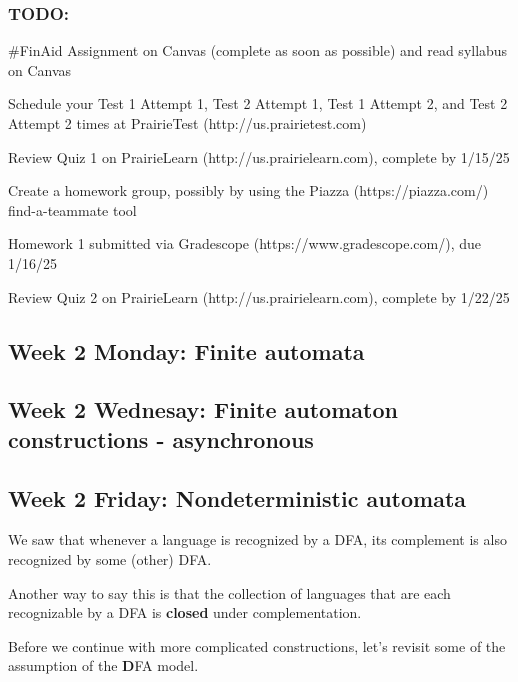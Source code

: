 \subsubsection*{TODO:}
\begin{list}{\itemsep-10pt}
   \item \#FinAid Assignment on Canvas (complete as soon as possible) and read syllabus on Canvas
   \item Schedule your Test 1 Attempt 1, Test 2 Attempt 1, Test 1 Attempt 2, and Test 2 Attempt 2 times 
   at PrairieTest (http://us.prairietest.com)
   \item Review Quiz 1 on PrairieLearn (http://us.prairielearn.com), complete by 1/15/25
   \item Create a homework group, possibly by using the Piazza (https://piazza.com/) find-a-teammate tool
   \item Homework 1 submitted via Gradescope (https://www.gradescope.com/), due 1/16/25
   \item Review Quiz 2 on PrairieLearn (http://us.prairielearn.com), complete by 1/22/25
\end{list}


\newpage

\subsection*{Week 2 Monday: Finite automata}




\subsection*{Week 2 Wednesay: Finite automaton constructions - asynchronous}



\newpage
\subsection*{Week 2 Friday: Nondeterministic automata}

We saw that whenever a language is recognized by a DFA, its
complement is also recognized by some (other) DFA. 

Another way to say this is that the collection of languages
that are each recognizable by a DFA is {\bf closed} under complementation.


Before we continue with more complicated constructions, let's revisit some of 
the assumption of the {\bf D}FA model.

